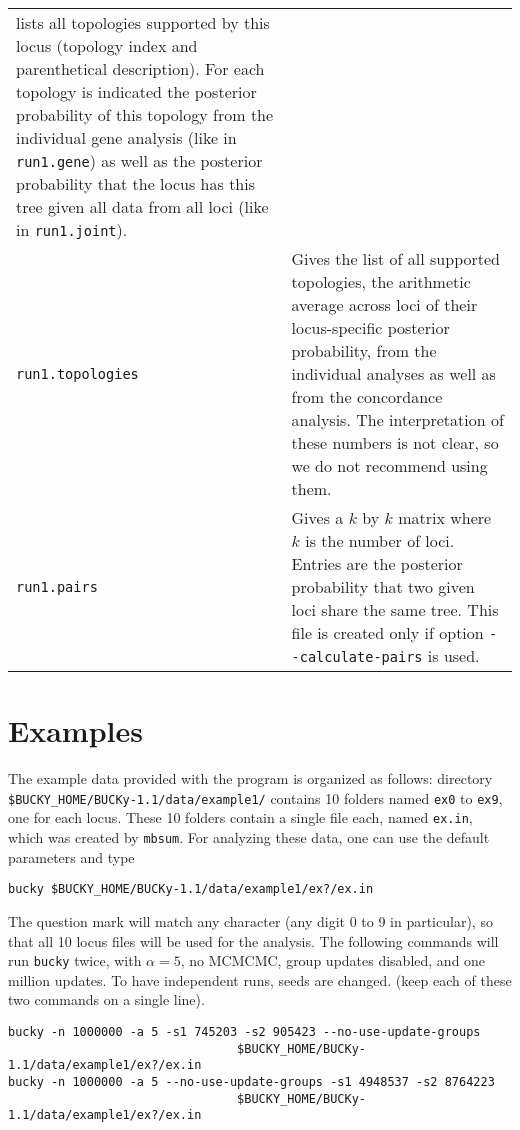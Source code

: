 \documentclass[12pt,english,final,letterpaper]{article}
\begin{document}
\begin{tabular}{l|p{5.5in}}
lists all topologies supported by this locus (topology index and parenthetical 
description). For each topology is indicated the posterior probability of 
this topology from the individual gene analysis (like in {\tt run1.gene}) 
as well as the posterior probability that the locus has this tree given all 
data from all loci (like in {\tt run1.joint}).\\
{\tt run1.topologies}&Gives the list of all supported topologies,
the arithmetic average across loci of their locus-specific posterior 
probability, from the individual analyses as well as from the concordance 
analysis. The interpretation of these numbers is not clear, so we do not 
recommend using them.\\
{\tt run1.pairs}&Gives a $k$ by $k$ matrix where $k$ is the number of loci.
Entries are the posterior probability that two given loci share the same tree.
This file is created only if option \verb+--calculate-pairs+ is used.
\end{tabular}

\section{Examples}

The example data provided with the program is organized as follows:
directory\\ \verb+$BUCKY_HOME/BUCKy-1.1/data/example1/+ %
contains 10 folders named {\tt ex0} to {\tt ex9}, one for each locus. 
These 10 folders contain a single file each, named {\tt ex.in}, which was 
created by  {\tt mbsum}. For analyzing these data, one
can use the default parameters and type
\begin{verbatim}
bucky $BUCKY_HOME/BUCKy-1.1/data/example1/ex?/ex.in
\end{verbatim}%
The question mark will match any character (any digit 0 to 9 in
particular), so that all 10 locus files will be used for the analysis.
The following commands will run {\tt bucky} twice, with 
$\alpha=5$, no MCMCMC, group updates disabled, and one million updates.
To have independent runs, seeds are changed. (keep each of these two
commands on a single line).

\begin{verbatim}
bucky -n 1000000 -a 5 -s1 745203 -s2 905423 --no-use-update-groups 
                                $BUCKY_HOME/BUCKy-1.1/data/example1/ex?/ex.in
bucky -n 1000000 -a 5 --no-use-update-groups -s1 4948537 -s2 8764223
                                $BUCKY_HOME/BUCKy-1.1/data/example1/ex?/ex.in
\end{verbatim}
\end{document}
